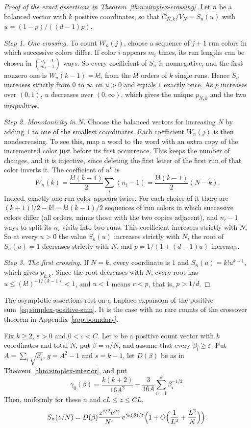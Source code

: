 \begin{proof}[Proof of the exact assertions in Theorem~\ref{thm:simplex-crossing}]
Let $n$ be a balanced vector with $k$ positive coordinates, so that
$C_{N,k}/V_N=S_n(u)$ with $u=(1-p)/((d-1)p)$.

\emph{Step 1. One crossing.} To count $W_n(j)$, choose a sequence of $j+1$ run
colors in which successive colors differ. If color $i$ appears $m_i$ times, its
run lengths can be chosen in $\binom{n_i-1}{m_i-1}$ ways. So every coefficient
of $S_n$ is nonnegative, and the first nonzero one is $W_n(k-1)=k!$, from the
$k!$ orders of $k$ single runs. Hence $S_n$ increases strictly from $0$ to
$\infty$ on $u>0$ and equals $1$ exactly once. As $p$ increases over $(0,1)$,
$u$ decreases over $(0,\infty)$, which gives the unique $p_{N,k}$ and the two
inequalities.

\emph{Step 2. Monotonicity in $N$.} Choose the balanced vectors for increasing
$N$ by adding $1$ to one of the smallest coordinates. Each coefficient $W_n(j)$
is then nondecreasing. To see this, map a word to the word with an extra copy of
the incremented color just before its first occurrence. This keeps the number
of changes, and it is injective, since deleting the first letter of the first
run of that color inverts it. The coefficient of $u^k$ is
\[
W_n(k)=\frac{k!(k-1)}2\sum_i(n_i-1)=\frac{k!(k-1)}2(N-k).
\]
Indeed, exactly one run color appears twice. For each choice of it there are
$(k+1)!/2-k!=k!(k-1)/2$ sequences of run colors in which successive colors
differ (all orders, minus those with the two copies adjacent), and $n_i-1$ ways to
split its $n_i$ visits into two runs. This coefficient increases strictly with
$N$. So at every $u>0$ the value $S_n(u)$ increases strictly with $N$, the root
of $S_n(u)=1$ decreases strictly with $N$, and $p=1/(1+(d-1)u)$ increases.

\emph{Step 3. The first crossing.} If $N=k$, every coordinate is $1$ and
$S_n(u)=k!u^{k-1}$, which gives $p_{k,k}$. Since the root decreases with $N$,
every root has $u\le(k!)^{-1/(k-1)}<1$, and $u<1$ means $r<p$, that is,
$p>1/d$.
\end{proof}

The asymptotic assertions rest on a Laplace expansion of the positive
sum~\eqref{eq:simplex-positive-sum}. It is the case with no rare counts of the
crossover theorem in Appendix~\ref{app:boundary}.

\begin{lemma}\label{lem:no-rare}
Fix $k\ge2$, $\varepsilon>0$ and $0<c<C$. Let $n$ be a positive count vector
with $k$ coordinates and total $N$, put $\beta=n/N$, and assume that every
$\beta_i\ge\varepsilon$. Put $A=\sum_i\sqrt{\beta_i}$, $g=A^2-1$ and $s=k-1$,
let $D(\beta)$ be as in Theorem~\ref{thm:simplex-interior}, and put
\[
\gamma_0(\beta)=\frac{k(k+2)}{16A^2}-\frac3{16A}\sum_{i=1}^k\beta_i^{-1/2}.
\]
Then, uniformly for these $n$ and $cL\le z\le CL$,
\begin{equation}\label{eq:no-rare}
S_n(z/N)=D(\beta)\frac{z^{s/2}e^{gz}}{N^s}\,e^{\gamma_0(\beta)/z}
\Bigl(1+O\Bigl(\frac1{L^2}+\frac{L^2}N\Bigr)\Bigr).
\end{equation}
\end{lemma}

